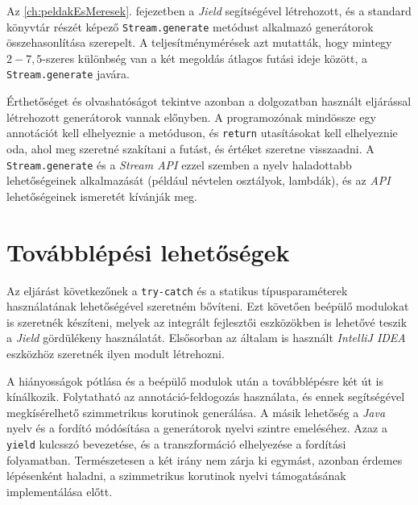 Az \ref{ch:peldakEsMeresek}. fejezetben a \textit{Jield} segítségével létrehozott, és a standard könyvtár részét képező \texttt{Stream.generate} metódust alkalmazó generátorok összehasonlítása szerepelt. A teljesítménymérések azt mutatták, hogy mintegy $2-7,5$-szeres különbség van a két megoldás átlagos futási ideje között, a \texttt{Stream.generate} javára. 

Érthetőséget és olvashatóságot tekintve azonban a dolgozatban használt eljárással létrehozott generátorok vannak előnyben. A programozónak mindössze egy annotációt kell elhelyeznie a metóduson, és \texttt{return} utasításokat kell elhelyeznie oda, ahol meg szeretné szakítani a futást, és értéket szeretne visszaadni. A \texttt{Stream.generate} és a \textit{Stream API} ezzel szemben a nyelv haladottabb lehetőségeinek alkalmazását (például névtelen osztályok, lambdák), és az \textit{API} lehetőségeinek ismeretét kívánják meg.

\section{Továbblépési lehetőségek}

Az eljárást következőnek a \texttt{try-catch} és a statikus típusparaméterek használatának lehetőségével szeretném bővíteni. Ezt követően beépülő modulokat is szeretnék készíteni, melyek az integrált fejlesztői eszközökben is lehetővé teszik a \textit{Jield} gördülékeny használatát. Elsősorban az általam is használt \textit{IntelliJ IDEA} eszközhöz szeretnék ilyen modult létrehozni. 

A hiányosságok pótlása és a beépülő modulok után a továbblépésre két út is kínálkozik. Folytatható az annotáció-feldogozás használata, és ennek segítségével megkísérelhető szimmetrikus korutinok generálása. A másik lehetőség a \textit{Java} nyelv és a fordító módósítása a generátorok nyelvi szintre emeléséhez. Azaz a \texttt{yield} kulcsszó bevezetése, és a transzformáció elhelyezése a fordítási folyamatban. Természetesen a két irány nem zárja ki egymást, azonban érdemes lépésenként haladni, a szimmetrikus korutinok nyelvi támogatásának implementálása előtt.